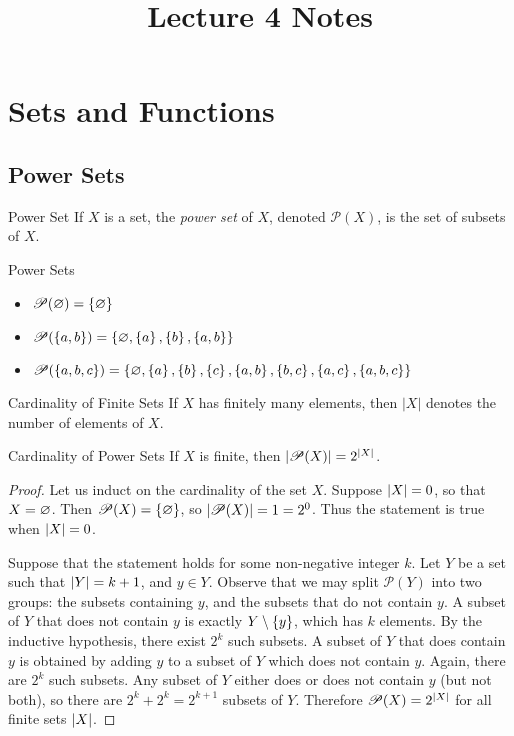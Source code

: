 \documentclass[class=article, crop=false]{standalone}
\title{Lecture 4 Notes}
\begin{document}
  \maketitle
  \newpage
  \section{Sets and Functions}
  \subsection{Power Sets}
  \begin{definition}{Power Set}
    If $X$ is a set, the \emph{power set} of $X$, denoted $\mathscr{P}(X)$, is the set of subsets of $X$.
  \end{definition}
  \begin{example}{Power Sets}
    \begin{itemize}
      \item $\mathscr{P}(\varnothing) = \left\{\varnothing\right\}$
      \item $\mathscr{P}(\left\{a, b\right\}) = \left\{\varnothing, \left\{a\right\}, \left\{b\right\}, \left\{a, b\right\}\right\}$
      \item $\mathscr{P}(\left\{a, b, c\right\}) = \left\{\varnothing, \left\{a\right\}, \left\{b\right\}, \left\{c\right\}, \left\{a, b\right\}, \left\{b, c\right\}, \left\{a, c\right\}, \left\{a, b, c\right\}\right\}$
    \end{itemize}
  \end{example}
  \begin{definition}{Cardinality of Finite Sets}
    If $X$ has finitely many elements, then $|X|$ denotes the number of elements of $X$.
  \end{definition}
  \begin{theorem}{Cardinality of Power Sets}
    If $X$ is finite, then $\left\lvert \mathscr{P}(X) \right\rvert = 2^{\left\lvert X \right\rvert}$.
  \end{theorem}
  \begin{proof}
    Let us induct on the cardinality of the set $X$. Suppose $\left\lvert X \right\rvert = 0$, so that $X = \varnothing$. Then $\mathscr{P}(X) = \left\{\varnothing\right\}$, so $\left\lvert \mathscr{P}(X) \right\rvert = 1 = 2^0$. Thus the statement is true when $\left\lvert X \right\rvert = 0$. \par
    Suppose that the statement holds for some non-negative integer $k$. Let $Y$ be a set such that $\left\lvert Y \right\rvert = k + 1$, and $y\in Y$. Observe that we may split $\mathscr{P}(Y)$ into two groups: the subsets containing $y$, and the subsets that do not contain $y$. A subset of $Y$ that does not contain $y$ is exactly $Y \setminus \left\{y\right\}$, which has $k$ elements. By the inductive hypothesis, there exist $2^k$ such subsets. A subset of $Y$ that does contain $y$ is obtained by adding $y$ to a subset of $Y$ which does not contain $y$. Again, there are $2^k$ such subsets. Any subset of $Y$ either does or does not contain $y$ (but not both), so there are $2^k + 2^k = 2^{k + 1}$ subsets of $Y$. Therefore $\mathscr{P}(X) = 2^{\left\lvert X \right\rvert}$ for all finite sets $\left\lvert X \right\rvert$.
  \end{proof}
\end{document}
